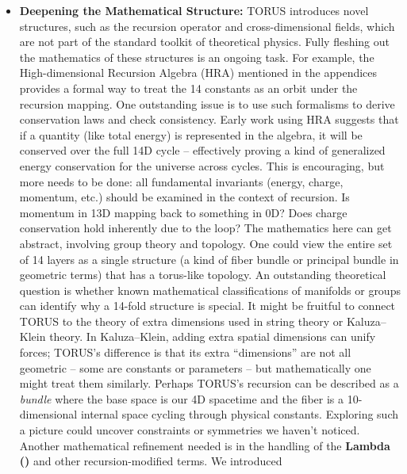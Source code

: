 \documentclass[
]{article}
\begin{document}
{\begin{itemize}
  means that developing a quantum version of TORUS (or demonstrating
  that the classical recursion naturally entails all quantum effects) is
  essential for the theory's long-term viability.
\item
  \textbf{Deepening the Mathematical Structure:} TORUS introduces novel
  structures, such as the recursion operator and cross-dimensional
  fields, which are not part of the standard toolkit of theoretical
  physics. Fully fleshing out the mathematics of these structures is an
  ongoing task. For example, the High-dimensional Recursion Algebra
  (HRA) mentioned in the appendices provides a formal way to treat the
  14 constants as an orbit under the recursion mapping\hspace{0pt}. One
  outstanding issue is to use such formalisms to derive conservation
  laws and check consistency. Early work using HRA suggests that if a
  quantity (like total energy) is represented in the algebra, it will be
  conserved over the full 14D cycle\hspace{0pt} -- effectively proving a
  kind of generalized energy conservation for the universe across
  cycles. This is encouraging, but more needs to be done: all
  fundamental invariants (energy, charge, momentum, etc.) should be
  examined in the context of recursion. Is momentum in 13D mapping back
  to something in 0D? Does charge conservation hold inherently due to
  the loop? The mathematics here can get abstract, involving group
  theory and topology. One could view the entire set of 14 layers as a
  single structure (a kind of fiber bundle or principal bundle in
  geometric terms) that has a torus-like topology. An outstanding
  theoretical question is whether known mathematical classifications of
  manifolds or groups can identify why a 14-fold structure is special.
  It might be fruitful to connect TORUS to the theory of extra
  dimensions used in string theory or Kaluza--Klein theory. In
  Kaluza--Klein, adding extra spatial dimensions can unify forces;
  TORUS's difference is that its extra ``dimensions'' are not all
  geometric -- some are constants or parameters -- but mathematically
  one might treat them similarly. Perhaps TORUS's recursion can be
  described as a \emph{bundle} where the base space is our 4D spacetime
  and the fiber is a 10-dimensional internal space cycling through
  physical constants. Exploring such a picture could uncover constraints
  or symmetries we haven't noticed. Another mathematical refinement
  needed is in the handling of the \textbf{Lambda (\Lambda)} and other
  recursion-modified terms. We introduced

\end{itemize}}
\end{document}
